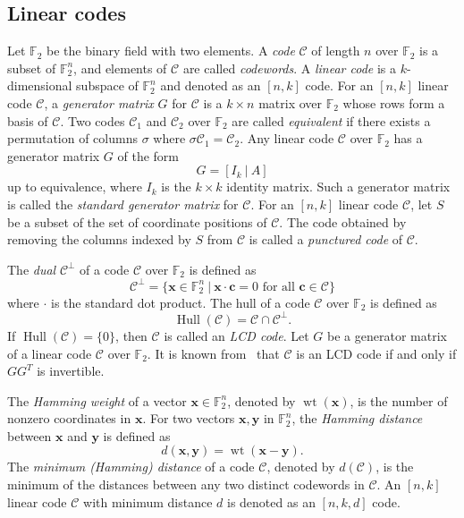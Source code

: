 \documentclass{article}
\theoremstyle{definition}
\theoremstyle{remark}
\begin{document}
\subsection{Linear codes}
Let $\mathbb{F}_2$ be the binary field with two elements. A \textit{code} $\mathcal{C}$ of length $n$ over $\mathbb{F}_2$ is a subset of $\mathbb{F}_2^n$, and elements of $\mathcal{C}$ are called \textit{codewords}. A \textit{linear code} is a $k$-dimensional subspace of $\mathbb{F}_2^n$ and denoted as an $[n,k]$ code. For an $[n,k]$ linear code $\mathcal{C}$, a \textit{generator matrix} $G$ for $\mathcal{C}$ is a $k\times n$ matrix over $\mathbb{F}_2$ whose rows form a basis of $\mathcal{C}$. Two codes $\mathcal{C}_1$ and $\mathcal{C}_2$ over $\mathbb{F}_2$ are called \textit{equivalent} if there exists a permutation of columns $\sigma$ where $\sigma \mathcal{C}_1 = \mathcal{C}_2$. Any linear code $\mathcal{C}$ over $\mathbb{F}_2$ has a generator matrix $G$ of the form
\[
G = [I_k~|~A]
\]
up to equivalence, where $I_k$ is the $k \times k$ identity matrix. Such a generator matrix is called the \textit{standard generator matrix} for $\mathcal{C}$. For an $[n,k]$ linear code $\mathcal{C}$, let $S$ be a subset of the set of coordinate positions of $\mathcal{C}$. The code obtained by removing the columns indexed by $S$ from $\mathcal{C}$ is called a \textit{punctured code} of $\mathcal{C}$.

The \textit{dual} $\mathcal{C}^{\perp}$ of a code $\mathcal{C}$ over $\mathbb{F}_2$ is defined as
\[
\mathcal{C}^\perp=\{\mathbf{x} \in \mathbb{F}_2^n~|~\mathbf{x} \cdot \mathbf{c} = 0  \textrm{ for all } \mathbf{c} \in \mathcal{C}\}
\]
where $\cdot$ is the standard dot product. The hull of a code $\mathcal{C}$ over $\mathbb{F}_2$ is defined as
\[
\operatorname{Hull}(\mathcal{C})=\mathcal{C}\cap \mathcal{C}^\perp.
\]
If $\operatorname{Hull}(\mathcal{C})=\{0\}$, then $\mathcal{C}$ is called an \textit{LCD code}. Let $G$ be a generator matrix of a linear code $\mathcal{C}$ over $\mathbb{F}_2$. It is known from~\cite{M-1992} that $\mathcal{C}$ is an LCD code if and only if $GG^T$ is invertible.

The \textit{Hamming weight} of a vector $\mathbf{x} \in \mathbb{F}_2^n$, denoted by $\operatorname{wt}(\mathbf{x})$, is the number of nonzero coordinates in $\mathbf{x}$. For two vectors $\mathbf{x}, \mathbf{y}$ in $\mathbb{F}_2^n$, the \textit{Hamming distance} between $\mathbf{x}$ and $\mathbf{y}$ is defined as
\[
d(\mathbf{x}, \mathbf{y})=\operatorname{wt}(\mathbf{x} - \mathbf{y}).
\]
The \textit{minimum (Hamming) distance} of a code $\mathcal{C}$, denoted by $d(\mathcal{C})$, is the minimum of the distances between any two distinct codewords in $\mathcal{C}$. An $[n,k]$ linear code $\mathcal{C}$ with minimum distance $d$ is denoted as an $[n,k,d]$ code.
\end{document}
